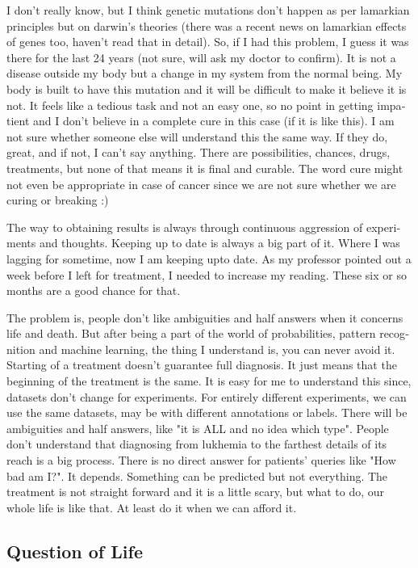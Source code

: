 \begin{english}
I don't really know, but I think genetic mutations don't happen as per lamarkian principles but on darwin's 
theories (there was a recent news on lamarkian effects of genes too, haven't read that in detail). 
So, if I had this problem, I guess it was there for the last 24 years (not sure, will ask my doctor 
to confirm). It is not a disease outside my body but a change in my system from the normal being. My 
body is built to have this mutation and it will be difficult to make it believe it is not. It 
feels like a tedious task and not an easy one, so no point in getting impatient and I don't believe in 
a complete cure in this case (if it is like this). I am not sure whether someone else will 
understand this the same way. If they do, great, and if not, I can't say anything. There are 
possibilities, chances, drugs, treatments, but none of that  means it is final and curable. The 
word cure might not even be appropriate in case of cancer since we are not sure whether we are curing 
or breaking :)

The way to obtaining results is always through continuous aggression of experiments and thoughts. Keeping 
up to date is always a big part of it. Where I was lagging for sometime, now I am keeping upto date. 
As my professor pointed out a week before I left for treatment, I needed to increase my reading. 
These six or so months are a good chance for that. 

The problem is, people don't like ambiguities and half answers when it concerns life and death. 
But after being a part of the world of probabilities, pattern recognition and machine learning, the thing 
I understand is, you can never avoid it. Starting of a treatment doesn't guarantee full diagnosis. 
It just means that the beginning of the treatment is the same. It is easy for me to understand this since, 
datasets don't change for experiments. For entirely different experiments, we can use the same datasets, 
may be with different annotations or labels. There will be ambiguities and half answers, 
like "it is ALL and no idea which type". People don't understand that diagnosing from lukhemia to 
the farthest details of its reach is a big process. There is no direct answer for patients' queries 
like "How bad am I?". It depends. Something can be predicted but not everything. The treatment is not 
straight forward and it is a little scary, but what to do, our whole life is like that. At least do it 
when we can afford it. 

\subsection*{Question of Life} 


\end{english}
